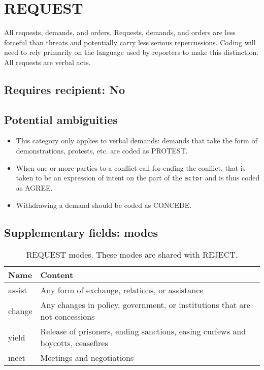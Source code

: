 \documentclass[11pt]{report}
\newcommand{\plcat}[1]{\textsf{#1}}
\newcommand{\txt}[1]{\texttt{#1}}
\begin{document}
\newpage

\section{REQUEST}

All requests, demands, and orders. Requests, demands, and orders are less forceful than threats and potentially carry less serious repercussions. Coding will need to rely primarily on the language used by reporters to make this distinction. All requests are verbal acts.

\subsection{Requires recipient: No}


\subsection{Potential ambiguities}

\begin{itemize}
\item This category only applies to verbal demands: demands that take the form of demonstrations, protests, etc. are coded as \plcat{PROTEST}.
\item When one or more parties to a conflict call for ending the conflict, that is taken to be an expression of intent on the part of the \txt{actor} and is thus coded as \plcat{AGREE}.
\item Withdrawing a demand should be coded as \plcat{CONCEDE}.

\end{itemize}


\subsection{Supplementary fields: modes}


\begin{table}[htp]
\caption{REQUEST modes. These modes are shared with REJECT.}
\begin{center}
\begin{tabular}{|l|p{13cm}|}
\hline
Name & Content \\
\hline
assist & Any form of exchange, relations, or assistance\\
change & Any changes in policy, government, or institutions that are not concessions \\
yield & Release of prisoners, ending sanctions, easing curfews and boycotts, ceasefires\\
meet & Meetings and negotiations\\
\hline
\end{tabular}
\end{center}
\label{tab:requestmode2}
\end{table}%
\end{document}
